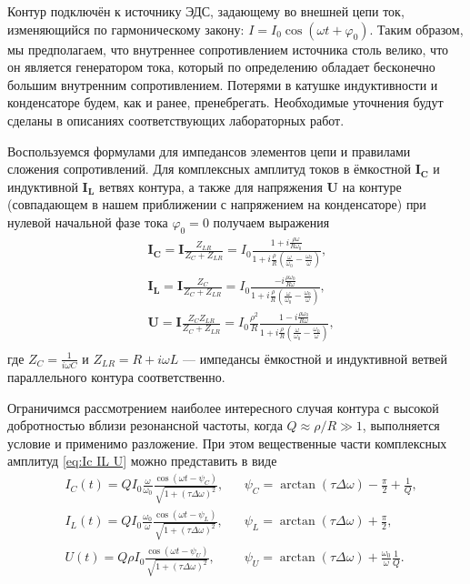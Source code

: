\documentclass[a4paper, 12pt]{article}
\begin{document}
Контур подключён к источнику ЭДС, задающему во внешней цепи ток, изменяющийся по гармоническому закону: $I = I_0 \cos{(\omega t + \varphi_0)}$. Таким образом, мы предполагаем, что внутреннее сопротивлением источника столь велико, что он является генератором тока, который по определению обладает бесконечно большим внутренним сопротивлением. Потерями в катушке индуктивности и конденсаторе будем, как и ранее, пренебрегать. Необходимые уточнения будут сделаны в описаниях соответствующих лабораторных работ.

Воспользуемся формулами для импедансов элементов цепи и правилами сложения сопротивлений. Для комплексных амплитуд токов в ёмкостной $\mathbf{I_C}$ и индуктивной $\mathbf{I_L}$ ветвях контура, а также для напряжения $\mathbf{U}$ на контуре (совпадающем в нашем приближении с напряжением на конденсаторе) при нулевой начальной фазе тока $\varphi_0 = 0$ получаем выражения
\begin{align}
& \mathbf{I_C} = \mathbf{I} \frac{Z_{LR}}{Z_C + Z_{LR}} = I_0 \frac{1 + i \frac{\rho \omega}{R \omega_0}}{1 + i \frac{\rho}{R}\left(\frac{\omega}{\omega_0} - \frac{\omega_0}{\omega}\right)}, \\
& \mathbf{I_L} = \mathbf{I} \frac{Z_{C}}{Z_C + Z_{LR}} = I_0 \frac{-i \frac{\rho \omega_0}{R \omega}}{1 + i \frac{\rho}{R}\left(\frac{\omega}{\omega_0} - \frac{\omega_0}{\omega}\right)}, \label{eq:Ic IL U} \\
& \mathbf{U} = \mathbf{I} \frac{Z_C Z_{LR}}{Z_C + Z_{LR}} = I_0 \frac{\rho^2}{R} \frac{1 - i \frac{\rho \omega_0}{R \omega}}{1 + i \frac{\rho}{R}\left(\frac{\omega}{\omega_0} - \frac{\omega_0}{\omega}\right)}, \\
\end{align}
где $Z_C = \frac{1}{i \omega C}$ и $Z_{LR} = R + i \omega L$ --- импедансы ёмкостной и индуктивной ветвей параллельного контура соответственно.

Ограничимся рассмотрением наиболее интересного случая контура с
высокой добротностью вблизи резонансной частоты, когда $Q\approx \rho / R \gg 1$,
выполняется условие и применимо разложение. При этом
вещественные части комплексных амплитуд \eqref{eq:Ic IL U} можно представить
в виде
\begin{align}
& I_C(t) = Q I_0 \frac{\omega}{\omega_0} \frac{\cos{(\omega t - \psi_C)}}{\sqrt{1 + (\tau \Delta{\omega})^2}}, & &\psi_C = \arctan{(\tau \Delta{\omega})} - \frac{\pi}{2} + \frac{1}{Q}, \\
& I_L(t) = Q I_0 \frac{\omega_0}{\omega} \frac{\cos{(\omega t - \psi_L)}}{\sqrt{1 + (\tau \Delta{\omega})^2}}, & &\psi_L = \arctan{(\tau \Delta{\omega})} + \frac{\pi}{2}, \label{eq:Ic IL U (t)} \\
& U(t) = Q \rho I_0 \frac{\cos{(\omega t - \psi_U)}}{\sqrt{1 + (\tau \Delta{\omega})^2}}, & &\psi_U = \arctan{(\tau \Delta{\omega})} + \frac{\omega_0}{\omega} \frac{1}{Q}. \\
\end{align}
\end{document}
